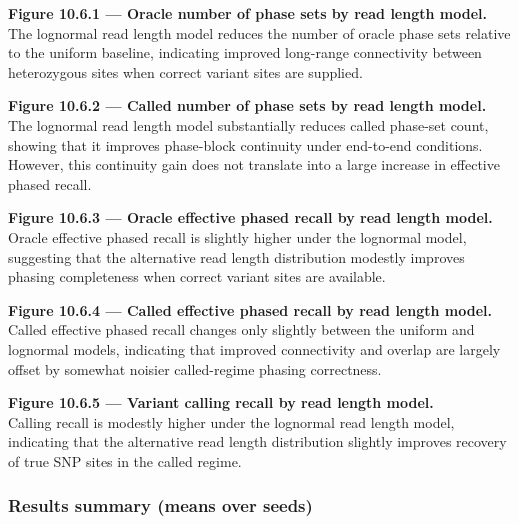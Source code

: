 \documentclass[
]{article}
\begin{document}
\textbf{Figure 10.6.1 --- Oracle number of phase sets by read length
model.}\\
The lognormal read length model reduces the number of oracle phase sets
relative to the uniform baseline, indicating improved long-range
connectivity between heterozygous sites when correct variant sites are
supplied.

\textbf{Figure 10.6.2 --- Called number of phase sets by read length
model.}\\
The lognormal read length model substantially reduces called phase-set
count, showing that it improves phase-block continuity under end-to-end
conditions. However, this continuity gain does not translate into a
large increase in effective phased recall.

\textbf{Figure 10.6.3 --- Oracle effective phased recall by read length
model.}\\
Oracle effective phased recall is slightly higher under the lognormal
model, suggesting that the alternative read length distribution modestly
improves phasing completeness when correct variant sites are available.

\textbf{Figure 10.6.4 --- Called effective phased recall by read length
model.}\\
Called effective phased recall changes only slightly between the uniform
and lognormal models, indicating that improved connectivity and overlap
are largely offset by somewhat noisier called-regime phasing
correctness.

\textbf{Figure 10.6.5 --- Variant calling recall by read length
model.}\\
Calling recall is modestly higher under the lognormal read length model,
indicating that the alternative read length distribution slightly
improves recovery of true SNP sites in the called regime.

\subsubsection{Results summary (means over
seeds)}\label{results-summary-means-over-seeds-4}
\end{document}
